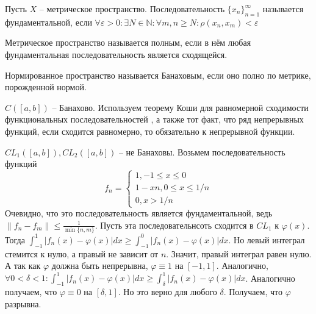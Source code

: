 \documentclass[document.tex]{subfiles}
\begin{document}
\begin{definition}
    Пусть $X$ -- метрическое пространство. Последовательность $\{x_n\}_{n = 1}^{\infty}$ называется фундаментальной,
    если $\forall \varepsilon > 0: \exists N \in \mathbb{N}: \forall m, n \geq N: \rho(x_n, x_m) < \varepsilon$
\end{definition}

\begin{definition}
    Метрическое пространство называется полным, если в нём любая фундаментальная последовательность является
    сходящейся.
\end{definition}

\begin{definition}
    Нормированное пространство называется Банаховым, если оно полно по метрике, порожденной нормой.
\end{definition}

\begin{example}
    $C([a, b])$ -- Банахово. Используем теорему Коши для равномерной сходимости функциональных последовательностей
    , а также тот факт, что ряд непрерывных функций, если сходится равномерно, то обязательно к непрерывной функции.
\end{example}

\begin{example}
    $CL_{1} ([a, b]), CL_{2} ([a, b])$ -- не Банаховы. Возьмем последовательность функций 
    \[
        f_n = 
        \begin{cases}
            1, -1 \leq x \leq 0 \\
            1 - xn, 0 \leq x \leq 1/n \\
            0, x > 1/n
        \end{cases}
    \]
    Очевидно, что это последовательность является фундаментальной, ведь $\|f_n - f_m\| \leq \frac{1}{\min \{n, m\}}$.
    Пусть эта последовательнсоть сходится в $CL_1$ к $\varphi(x)$. Тогда $\int_{-1}^{1}|f_n(x) - \varphi(x)|dx \geq
    \int_{-1}^{0}|f_n(x) - \varphi(x)|dx$. Но левый интеграл стемится к нулю, а правый не зависит от $n$. Значит, правый
    интеграл равен нулю. А так как $\varphi$ должна быть непрерывна, $\varphi \equiv 1$ на $[-1, 1]$. Аналогично,
    $\forall 0 < \delta < 1: \int_{-1}^{1}|f_n(x) - \varphi(x)|dx \geq \int_{\delta}^{1}|f_n(x) - \varphi(x)|dx$.
    Аналогично получаем, что $\varphi \equiv 0$ на $[\delta, 1]$. Но это верно для любого $\delta$. Получаем, что
    $\varphi$ разрывна.
\end{example}
\end{document}
